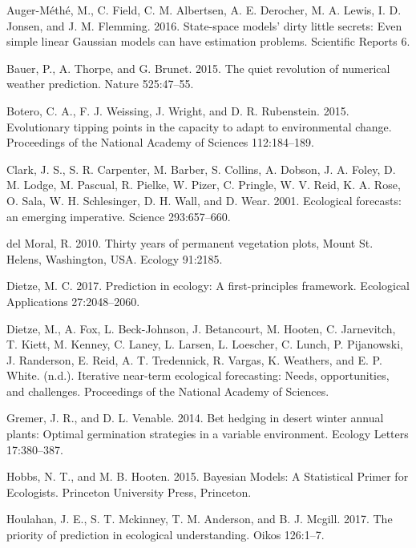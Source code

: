 \documentclass[12pt,]{article}
\begin{document}
\hypertarget{refs}{}
\hypertarget{ref-Auger-Methe2016}{}
Auger-Méthé, M., C. Field, C. M. Albertsen, A. E. Derocher, M. A. Lewis,
I. D. Jonsen, and J. M. Flemming. 2016. State-space models' dirty little
secrets: Even simple linear Gaussian models can have estimation
problems. Scientific Reports 6.

\hypertarget{ref-Bauer2015}{}
Bauer, P., A. Thorpe, and G. Brunet. 2015. The quiet revolution of
numerical weather prediction. Nature 525:47--55.

\hypertarget{ref-Botero2015}{}
Botero, C. A., F. J. Weissing, J. Wright, and D. R. Rubenstein. 2015.
Evolutionary tipping points in the capacity to adapt to environmental
change. Proceedings of the National Academy of Sciences 112:184--189.

\hypertarget{ref-Clark2001}{}
Clark, J. S., S. R. Carpenter, M. Barber, S. Collins, A. Dobson, J. A.
Foley, D. M. Lodge, M. Pascual, R. Pielke, W. Pizer, C. Pringle, W. V.
Reid, K. A. Rose, O. Sala, W. H. Schlesinger, D. H. Wall, and D. Wear.
2001. Ecological forecasts: an emerging imperative. Science
293:657--660.

\hypertarget{ref-DelMoral2010}{}
{del Moral}, R. 2010. Thirty years of permanent vegetation plots, Mount
St. Helens, Washington, USA. Ecology 91:2185.

\hypertarget{ref-Dietze2017a}{}
Dietze, M. C. 2017. Prediction in ecology: A first-principles framework.
Ecological Applications 27:2048--2060.

\hypertarget{ref-Dietze2018}{}
Dietze, M., A. Fox, L. Beck-Johnson, J. Betancourt, M. Hooten, C.
Jarnevitch, T. Kiett, M. Kenney, C. Laney, L. Larsen, L. Loescher, C.
Lunch, P. Pijanowski, J. Randerson, E. Reid, A. T. Tredennick, R.
Vargas, K. Weathers, and E. P. White. (n.d.). Iterative near-term
ecological forecasting: Needs, opportunities, and challenges.
Proceedings of the National Academy of Sciences.

\hypertarget{ref-Gremer2014}{}
Gremer, J. R., and D. L. Venable. 2014. Bet hedging in desert winter
annual plants: Optimal germination strategies in a variable environment.
Ecology Letters 17:380--387.

\hypertarget{ref-Hobbs2015}{}
Hobbs, N. T., and M. B. Hooten. 2015. Bayesian Models: A Statistical
Primer for Ecologists. Princeton University Press, Princeton.

\hypertarget{ref-Houlahan2017}{}
Houlahan, J. E., S. T. Mckinney, T. M. Anderson, and B. J. Mcgill. 2017.
The priority of prediction in ecological understanding. Oikos 126:1--7.
\end{document}
